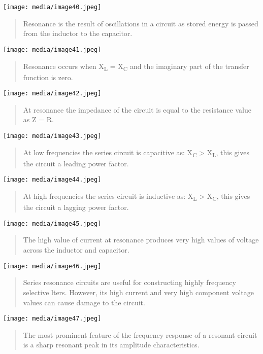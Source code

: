 \documentclass[]{article}
\begin{document}
\texttt{[image: media/image40.jpeg]}

\begin{quote}
Resonance is the result of oscillations in a circuit as stored energy is
passed from the inductor to the capacitor.
\end{quote}

\texttt{[image: media/image41.jpeg]}

\begin{quote}
Resonance occurs when X\textsubscript{L} = X\textsubscript{C} and the
imaginary part of the transfer function is zero.
\end{quote}

\texttt{[image: media/image42.jpeg]}

\begin{quote}
At resonance the impedance of the circuit is equal to the resistance
value as Z = R.
\end{quote}

\texttt{[image: media/image43.jpeg]}

\begin{quote}
At low frequencies the series circuit is capacitive as:
X\textsubscript{C} \textgreater{} X\textsubscript{L}, this gives the
circuit a leading power factor.
\end{quote}

\texttt{[image: media/image44.jpeg]}

\begin{quote}
At high frequencies the series circuit is inductive as:
X\textsubscript{L} \textgreater{} X\textsubscript{C}, this gives the
circuit a lagging power factor.
\end{quote}

\texttt{[image: media/image45.jpeg]}

\begin{quote}
The high value of current at resonance produces very high values of
voltage across the inductor and capacitor.
\end{quote}

\texttt{[image: media/image46.jpeg]}

\begin{quote}
Series resonance circuits are useful for constructing highly frequency
selective lters. However, its high current and very high component
voltage values can cause damage to the circuit.
\end{quote}

\texttt{[image: media/image47.jpeg]}

\begin{quote}
The most prominent feature of the frequency response of a resonant
circuit is a sharp resonant peak in its amplitude characteristics.
\end{quote}
\end{document}

